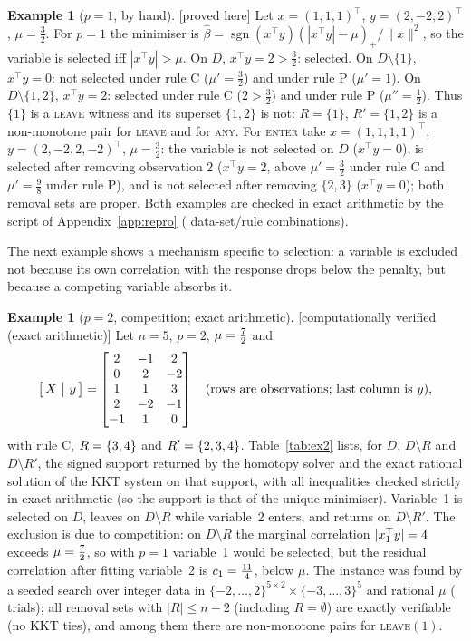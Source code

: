\documentclass[10pt,a4paper]{article}
\theoremstyle{plain}
\theoremstyle{definition}
\newtheorem{example}[theorem]{Example}
\theoremstyle{remark}
\newcommand{\sgn}{\operatorname{sgn}}
\newcommand{\status}[1]{\textnormal{\textsf{\small [#1]}}}
\newcommand{\Dm}{D\setminus R}
\newcommand{\tsc}[1]{\textnormal{\textsc{#1}}}  %
\begin{document}
\begin{example}[$p=1$, by hand]\label{ex:one}\status{proved here}
Let $x=(1,1,1)^{\top}$, $y=(2,-2,2)^{\top}$, $\mu=\tfrac32$. For $p=1$ the minimiser is $\hat\beta=\sgn(x^{\top}y)(|x^{\top}y|-\mu)_+/\lVert x\rVert^2$, so the variable is selected iff $|x^{\top}y|>\mu$. On $D$, $x^{\top}y=2>\tfrac32$: selected. On $D\setminus\{1\}$, $x^{\top}y=0$: not selected under rule C ($\mu'=\tfrac32$) and under rule P ($\mu'=1$). On $D\setminus\{1,2\}$, $x^{\top}y=2$: selected under rule C ($2>\tfrac32$) and under rule P ($\mu''=\tfrac12$). Thus $\{1\}$ is a \tsc{leave} witness and its superset $\{1,2\}$ is not: $R=\{1\}$, $R'=\{1,2\}$ is a non-monotone pair for \tsc{leave} and for \tsc{any}. For \tsc{enter} take $x=(1,1,1,1)^{\top}$, $y=(2,-2,2,-2)^{\top}$, $\mu=\tfrac32$: the variable is not selected on $D$ ($x^{\top}y=0$), is selected after removing observation $2$ ($x^{\top}y=2$, above $\mu'=\tfrac32$ under rule C and $\mu'=\tfrac98$ under rule P), and is not selected after removing $\{2,3\}$ ($x^{\top}y=0$); both removal sets are proper. Both examples are checked in exact arithmetic by the script of Appendix~\ref{app:repro} (\ExOneChecks{} data-set/rule combinations).
\end{example}

The next example shows a mechanism specific to selection: a variable is excluded not because its own correlation with the response drops below the penalty, but because a competing variable absorbs it.

\begin{example}[$p=2$, competition; exact arithmetic]\label{ex:two}\status{computationally verified (exact arithmetic)}
Let $n=5$, $p=2$, $\mu=\tfrac{7}{2}$ and
\[
\bigl[\,X\ \big|\ y\,\bigr]=\begin{bmatrix}\ExTwoRows\end{bmatrix}\quad\text{(rows are observations; last column is $y$)},
\]
with rule C, $R=\{3,4\}$ and $R'=\{2,3,4\}$. Table~\ref{tab:ex2} lists, for $D$, $\Dm$ and $D\setminus R'$, the signed support returned by the homotopy solver and the exact rational solution of the KKT system on that support, with all inequalities checked strictly in exact arithmetic (so the support is that of the unique minimiser). Variable~1 is selected on $D$, leaves on $\Dm$ while variable~2 enters, and returns on $D\setminus R'$. The exclusion is due to competition: on $\Dm$ the marginal correlation $|x_1^{\top}y|=4$ exceeds $\mu=\tfrac{7}{2}$, so with $p=1$ variable~1 would be selected, but the residual correlation after fitting variable~2 is $c_1=\tfrac{11}{4}$, below $\mu$. The instance was found by a seeded search over integer data in $\{-2,\dots,2\}^{5\times2}\times\{-3,\dots,3\}^5$ and rational $\mu$ (\ExTwoTrials{} trials); all \ExTwoSubsets{} removal sets with $|R|\le n-2$ (including $R=\emptyset$) are exactly verifiable (no KKT ties), and among them there are \ExTwoPairs{} non-monotone pairs for \tsc{leave}$(1)$.
\end{example}
\end{document}
